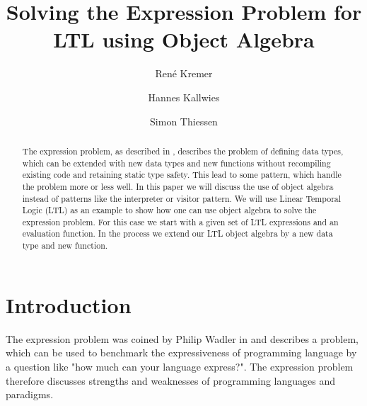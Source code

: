 \documentclass{llncs}
\begin{document}
%
\frontmatter          %
%
\pagestyle{headings}  %
%
\mainmatter              %
%
\title{Solving the Expression Problem for LTL using Object Algebra}
%
%
\author{Ren\'e Kremer%
\and
Hannes Kallwies%
\and
Simon Thiessen%
}
%
%
%

\maketitle              %

\begin{abstract}
The expression problem, as described in \cite{wadler}, describes the problem of defining data types, which can be extended with new data types and new functions without recompiling existing code and retaining static type safety. This lead to some pattern, which handle the problem more or less well. In this paper we will discuss the use of object algebra instead of patterns like the interpreter or visitor pattern. We will use Linear Temporal Logic (LTL) \cite{pnueli} as an example to show how one can use object algebra to solve the expression problem. For this case we start with a given set of LTL expressions and an evaluation function. In the process we extend our LTL object algebra by a new data type and new function.
\end{abstract}
%
\section{Introduction} \label{sec:introduction}
The expression problem was coined by Philip Wadler in \cite{wadler} and describes a problem, which can be used to benchmark the expressiveness of programming language by a question like "how much can your language express?". The expression problem therefore discusses strengths and weaknesses of programming languages and paradigms.
\end{document}
